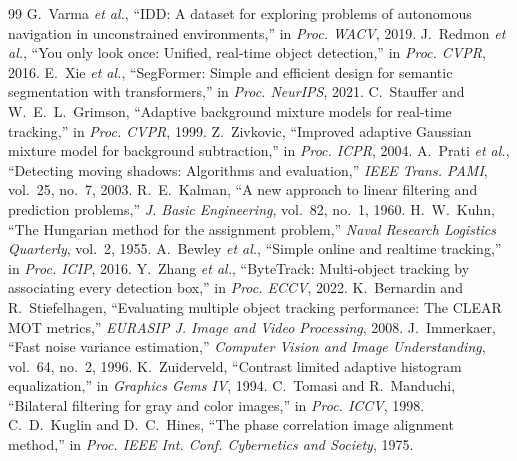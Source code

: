\documentclass[10pt,twocolumn,a4paper]{article}
\begin{document}
\begin{thebibliography}{99}\small
{} G.~Varma \emph{et al.}, ``IDD: A dataset for exploring problems of autonomous navigation in unconstrained environments,'' in \emph{Proc. WACV}, 2019.
 J.~Redmon \emph{et al.}, ``You only look once: Unified, real-time object detection,'' in \emph{Proc. CVPR}, 2016.
 E.~Xie \emph{et al.}, ``SegFormer: Simple and efficient design for semantic segmentation with transformers,'' in \emph{Proc. NeurIPS}, 2021.
 C.~Stauffer and W.~E.~L.~Grimson, ``Adaptive background mixture models for real-time tracking,'' in \emph{Proc. CVPR}, 1999.
 Z.~Zivkovic, ``Improved adaptive Gaussian mixture model for background subtraction,'' in \emph{Proc. ICPR}, 2004.
 A.~Prati \emph{et al.}, ``Detecting moving shadows: Algorithms and evaluation,'' \emph{IEEE Trans. PAMI}, vol.~25, no.~7, 2003.
 R.~E.~Kalman, ``A new approach to linear filtering and prediction problems,'' \emph{J. Basic Engineering}, vol.~82, no.~1, 1960.
 H.~W.~Kuhn, ``The Hungarian method for the assignment problem,'' \emph{Naval Research Logistics Quarterly}, vol.~2, 1955.
 A.~Bewley \emph{et al.}, ``Simple online and realtime tracking,'' in \emph{Proc. ICIP}, 2016.
 Y.~Zhang \emph{et al.}, ``ByteTrack: Multi-object tracking by associating every detection box,'' in \emph{Proc. ECCV}, 2022.
 K.~Bernardin and R.~Stiefelhagen, ``Evaluating multiple object tracking performance: The CLEAR MOT metrics,'' \emph{EURASIP J. Image and Video Processing}, 2008.
 J.~Immerkaer, ``Fast noise variance estimation,'' \emph{Computer Vision and Image Understanding}, vol.~64, no.~2, 1996.
 K.~Zuiderveld, ``Contrast limited adaptive histogram equalization,'' in \emph{Graphics Gems IV}, 1994.
 C.~Tomasi and R.~Manduchi, ``Bilateral filtering for gray and color images,'' in \emph{Proc. ICCV}, 1998.
 C.~D.~Kuglin and D.~C.~Hines, ``The phase correlation image alignment method,'' in \emph{Proc. IEEE Int. Conf. Cybernetics and Society}, 1975.
\end{thebibliography}
\end{document}
